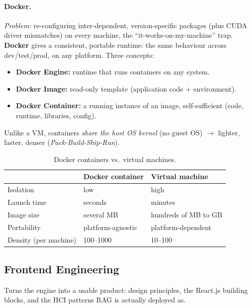 \documentclass{article}
\begin{document}
\paragraph{Docker.} \textit{Problem:} re-configuring inter-dependent, version-specific packages (plus CUDA driver mismatches) on every machine, the ``it-works-on-my-machine'' trap. \textbf{Docker} gives a consistent, portable runtime: the same behaviour across dev/test/prod, on any platform. Three concepts:
\begin{itemize}
    \item \textbf{Docker Engine:} runtime that runs containers on any system.
    \item \textbf{Docker Image:} read-only template (application code $+$ environment).
    \item \textbf{Docker Container:} a running instance of an image, self-sufficient (code, runtime, libraries, config).
\end{itemize}
Unlike a VM, containers \textit{share the host OS kernel} (no guest OS) $\rightarrow$ lighter, faster, denser (\textit{Pack-Build-Ship-Run}).

\begin{table}[H]
\centering
\small
\begin{tabular}{@{}lll@{}}
\toprule
 & \textbf{Docker container} & \textbf{Virtual machine} \\
\midrule
Isolation & low & high \\
Launch time & seconds & minutes \\
Image size & several MB & hundreds of MB to GB \\
Portability & platform-agnostic & platform-dependent \\
Density (per machine) & 100--1000 & 10--100 \\
\bottomrule
\end{tabular}
\caption{Docker containers vs.\ virtual machines.}
\label{tab:docker-vm}
\end{table}

\subsection{Frontend Engineering}
Turns the engine into a usable product: design principles, the React.js building blocks, and the HCI patterns RAG is actually deployed as.
\end{document}
